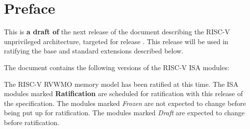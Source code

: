 \chapter{Preface}

This is {\bf a draft of} the next release of the document describing
the RISC-V unprivileged architecture, targeted for release \specrev.
This release will be used in ratifying the base and standard
extensions described below.

The document contains the following versions of the RISC-V ISA
modules:

The RISC-V RVWMO memory model has been ratified at this time.  The ISA
modules marked {\bf Ratification} are scheduled for ratification with
this release of the specification.  The modules marked {\em Frozen}
are not expected to change before being put up for ratification.  The
modules marked {\em Draft} are expected to change before ratification.


